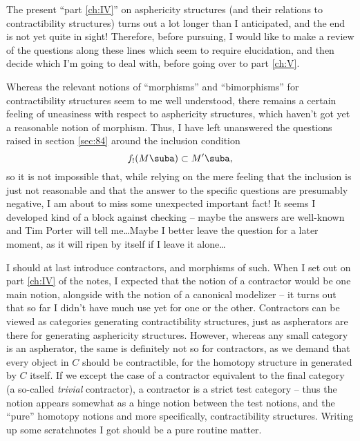 \label{sec:88}%
The present ``part \ref{ch:IV}'' on asphericity structures (and their
relations to contractibility structures) turns out a lot longer than I
anticipated, and the end is not yet quite in sight! Therefore, before
pursuing, I would like to make a review of the questions along these
lines which seem to require elucidation, and then decide which I'm
going to deal with, before going over to part \ref{ch:V}.

\enspace Whereas the relevant notions of
``morphisms'' and ``bimorphisms'' for contractibility structures seem
to me well understood, there remains a certain feeling of
uneasiness with respect to asphericity structures, which haven't got
yet a reasonable notion of morphism. Thus, I have left unanswered the
questions raised in section \ref{sec:84} around the inclusion
condition
\[ f_!(M\suba) \subset M'\suba,\]
so it is not impossible that, while relying on the mere feeling that
the inclusion is just not reasonable and that the answer to the
specific questions are presumably negative, I am about to miss some
unexpected important fact! It seems I developed kind of a block
against checking -- maybe the answers are well-known and Tim Porter
will tell me\ldots Maybe I better leave the question for a later
moment, as it will ripen by itself if I leave it alone\ldots

\enspace I should at last introduce
contractors, and morphisms of such. When I set out on part \ref{ch:IV}
of the notes, I expected that the notion of a contractor would be one
main notion, alongside with the notion of a canonical modelizer -- it
turns out that so far I didn't have much use yet for one or the
other. Contractors can be viewed as categories generating
contractibility structures, just as aspherators are there for
generating asphericity structures. However, whereas any small category
is an aspherator, the same is definitely not so for contractors, as we
demand that every object in $C$ should be contractible, for the
homotopy structure in \Chat{} generated by $C$ itself. If we except
the case of a contractor equivalent to the final category (a so-called
\emph{trivial} contractor), a contractor is a strict test category --
thus the notion appears somewhat as a hinge notion between the test
notions, and the ``pure'' homotopy notions and more specifically,
contractibility structures. Writing up some scratchnotes I got should
be a pure routine matter.

